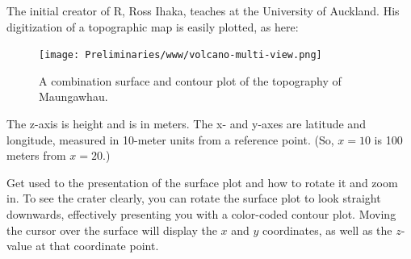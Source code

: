 \documentclass[
  letterpaper,
  DIV=11,
  numbers=noendperiod,
  oneside]{article}
\begin{document}
\begin{multicols}{2}
\begin{table}
\begin{minipage}[t]{\linewidth}
\end{minipage}%
\newline
\begin{minipage}[t]{\linewidth}

{\centering 

The initial creator of R, Ross Ihaka, teaches at the University of
Auckland. His digitization of a topographic map is easily plotted, as
here:

}

\end{minipage}%
\newline
\begin{minipage}[t]{\linewidth}

{\centering 

\begin{figure}

{\centering \texttt{[image: Preliminaries/www/volcano-multi-view.png]}

}

\caption{\label{fig-Maungawhau-plot}A combination surface and contour
plot of the topography of Maungawhau.}

\end{figure}

}

\end{minipage}%
\newline
\begin{minipage}[t]{\linewidth}

{\centering 

The z-axis is height and is in meters. The x- and y-axes are latitude
and longitude, measured in 10-meter units from a reference point. (So,
\(x=10\) is 100 meters from \(x=20\).)

}

\end{minipage}%
\newline
\begin{minipage}[t]{\linewidth}

{\centering 

Get used to the presentation of the surface plot and how to rotate it
and zoom in. To see the crater clearly, you can rotate the surface plot
to look straight downwards, effectively presenting you with a
color-coded contour plot. Moving the cursor over the surface will
display the \(x\) and \(y\) coordinates, as well as the \(z\)-value at
that coordinate point.

}

\end{minipage}%
\newline
\begin{minipage}[t]{\linewidth}


\end{minipage}
\end{table}
\end{multicols}
\end{document}
